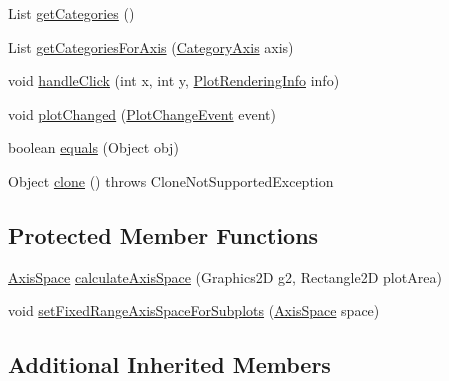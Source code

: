 \begin{DoxyCompactItemize}
\item 
List \mbox{\hyperlink{classorg_1_1jfree_1_1chart_1_1plot_1_1_combined_domain_category_plot_ac5d8ee1479835bbce04b4295f5e388ab}{get\+Categories}} ()
\item 
List \mbox{\hyperlink{classorg_1_1jfree_1_1chart_1_1plot_1_1_combined_domain_category_plot_ab0ae581ee1192a87e8784009ea7623fb}{get\+Categories\+For\+Axis}} (\mbox{\hyperlink{classorg_1_1jfree_1_1chart_1_1axis_1_1_category_axis}{Category\+Axis}} axis)
\item 
void \mbox{\hyperlink{classorg_1_1jfree_1_1chart_1_1plot_1_1_combined_domain_category_plot_adf5e46eea99011a9496ee4bbb4aac526}{handle\+Click}} (int x, int y, \mbox{\hyperlink{classorg_1_1jfree_1_1chart_1_1plot_1_1_plot_rendering_info}{Plot\+Rendering\+Info}} info)
\item 
void \mbox{\hyperlink{classorg_1_1jfree_1_1chart_1_1plot_1_1_combined_domain_category_plot_a96378adcdc9dbe0c53fbcb672118a26c}{plot\+Changed}} (\mbox{\hyperlink{classorg_1_1jfree_1_1chart_1_1event_1_1_plot_change_event}{Plot\+Change\+Event}} event)
\item 
boolean \mbox{\hyperlink{classorg_1_1jfree_1_1chart_1_1plot_1_1_combined_domain_category_plot_a5afaa63e6b81a55d79233b2ece33ff75}{equals}} (Object obj)
\item 
Object \mbox{\hyperlink{classorg_1_1jfree_1_1chart_1_1plot_1_1_combined_domain_category_plot_a7a0baa8cb7fd6bdfe048955ded93b877}{clone}} ()  throws Clone\+Not\+Supported\+Exception 
\end{DoxyCompactItemize}
\subsection*{Protected Member Functions}
\begin{DoxyCompactItemize}
\item 
\mbox{\hyperlink{classorg_1_1jfree_1_1chart_1_1axis_1_1_axis_space}{Axis\+Space}} \mbox{\hyperlink{classorg_1_1jfree_1_1chart_1_1plot_1_1_combined_domain_category_plot_ac459e1e964ebb779d1a95bb9c681207a}{calculate\+Axis\+Space}} (Graphics2D g2, Rectangle2D plot\+Area)
\item 
void \mbox{\hyperlink{classorg_1_1jfree_1_1chart_1_1plot_1_1_combined_domain_category_plot_a6675c4d67418b1b6a5b361ac8279333c}{set\+Fixed\+Range\+Axis\+Space\+For\+Subplots}} (\mbox{\hyperlink{classorg_1_1jfree_1_1chart_1_1axis_1_1_axis_space}{Axis\+Space}} space)
\end{DoxyCompactItemize}
\subsection*{Additional Inherited Members}


